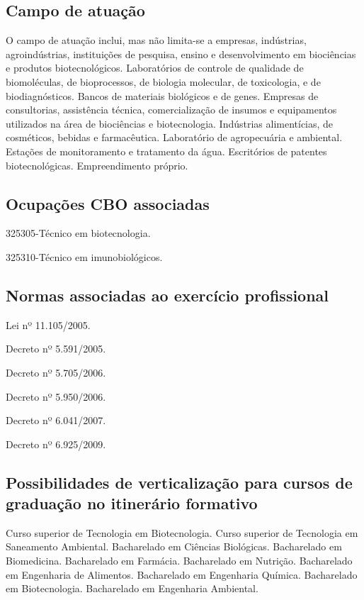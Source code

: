 \documentclass[11pt,fleqn]{book} %
\begin{document}
\subsection{Campo de atuação}
\indent

O campo de atuação inclui, mas não limita-se a empresas, indústrias, agroindústrias, instituições de pesquisa, ensino e desenvolvimento em biociências e produtos biotecnológicos.
Laboratórios de controle de qualidade de biomoléculas, de bioprocessos, de biologia molecular, de toxicologia, e de biodiagnósticos.%
Bancos de materiais biológicos e de genes. 
Empresas de consultorias, assistência técnica, comercialização de insumos e equipamentos utilizados na área de biociências e biotecnologia. 
Indústrias alimentícias, de cosméticos, bebidas e farmacêutica. 
Laboratório de agropecuária e ambiental. 
Estações de monitoramento e tratamento da água. 
Escritórios de patentes biotecnológicas. 
Empreendimento próprio.

\subsection{Ocupações CBO associadas}
\indent

325305-Técnico em biotecnologia. 

325310-Técnico em imunobiológicos.

\subsection{Normas associadas ao exercício profissional}
\indent

Lei nº 11.105/2005. 

Decreto nº 5.591/2005. 

Decreto nº 5.705/2006. 

Decreto nº 5.950/2006. 

Decreto nº 6.041/2007.

Decreto nº 6.925/2009. 

\subsection{Possibilidades de verticalização para cursos de graduação no itinerário formativo}

Curso superior de Tecnologia em Biotecnologia. 
Curso superior de Tecnologia em Saneamento Ambiental. 
Bacharelado em Ciências Biológicas. 
Bacharelado em Biomedicina. 
Bacharelado em Farmácia. 
Bacharelado em Nutrição. 
Bacharelado em Engenharia de Alimentos. 
Bacharelado em Engenharia Química. 
Bacharelado em Biotecnologia. 
Bacharelado em Engenharia Ambiental.
\end{document}
